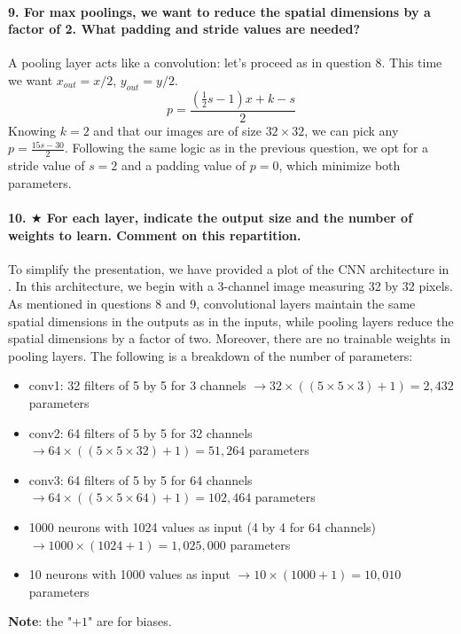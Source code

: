\paragraph{9. For max poolings, we want to reduce the spatial dimensions by a factor of 2. What padding and stride values are needed?}
A pooling layer acts like a convolution: let's proceed as in question 8. This time we want $ x_{out} = x/2$, $ y_{out} = y/2 $.
\[
    p = \frac{(\frac{1}{2}s - 1) x + k - s}{2}
\]
Knowing $k = 2$ and that our images are of size $32 \times 32 $, we can pick any $p = \frac{15s - 30}{2}$. Following the same logic as in the previous question, we opt for a stride value of $ s = 2 $ and a padding value of $ p = 0 $, which minimize both parameters.

\paragraph{10. $ \bigstar $ For each layer, indicate the output size and the number of weights to learn. Comment on this repartition.}
To simplify the presentation, we have provided a plot of the CNN architecture in . In this architecture, we begin with a 3-channel image measuring 32 by 32 pixels. As mentioned in questions 8 and 9, convolutional layers maintain the same spatial dimensions in the outputs as in the inputs, while pooling layers reduce the spatial dimensions by a factor of two. Moreover, there are no trainable weights in pooling layers. The following is a breakdown of the number of parameters:
\begin{itemize}
    \item conv1: 32 filters of 5 by 5 for 3 channels $\rightarrow 32 \times ((5\times 5\times 3) + 1) = 2,432$ parameters
    \item conv2: 64 filters of 5 by 5 for 32 channels $\rightarrow 64\times ((5\times 5\times 32) + 1) = 51,264$ parameters
    \item conv3: 64 filters of 5 by 5 for 64 channels $\rightarrow 64\times ((5\times 5\times 64) + 1) = 102,464$ parameters
    \item 1000 neurons with 1024 values as input (4 by 4 for 64 channels) $\rightarrow 1000 \times (1024 + 1) = 1,025,000$ parameters
    \item 10 neurons with 1000 values as input $\rightarrow 10 \times (1000 + 1) = 10,010$ parameters
\end{itemize}

\noindent \textbf{Note}: the "$+1$" are for biases.\\

